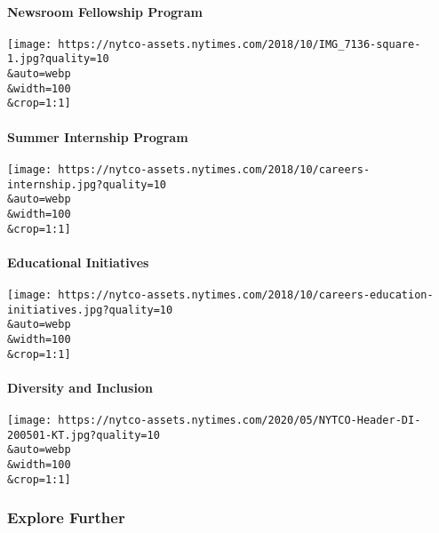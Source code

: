 \href{https://www.nytco.com/careers/newsroom/newsroom-fellowship/}{}

\hypertarget{newsroom-fellowship-program}{%
\paragraph{Newsroom Fellowship
Program}\label{newsroom-fellowship-program}}

\texttt{[image: https://nytco-assets.nytimes.com/2018/10/IMG\_7136-square-1.jpg?quality=10\\\&auto=webp\\\&width=100\\\&crop=1:1]}

\href{https://www.nytco.com/careers/summer-internship-program/}{}

\hypertarget{summer-internship-program}{%
\paragraph{Summer Internship Program}\label{summer-internship-program}}

\texttt{[image: https://nytco-assets.nytimes.com/2018/10/careers-internship.jpg?quality=10\\\&auto=webp\\\&width=100\\\&crop=1:1]}

\href{https://www.nytco.com/social-responsibility/educational-initiatives/}{}

\hypertarget{educational-initiatives}{%
\paragraph{Educational Initiatives}\label{educational-initiatives}}

\texttt{[image: https://nytco-assets.nytimes.com/2018/10/careers-education-initiatives.jpg?quality=10\\\&auto=webp\\\&width=100\\\&crop=1:1]}

\href{https://www.nytco.com/company/diversity-and-inclusion/}{}

\hypertarget{diversity-and-inclusion}{%
\paragraph{Diversity and Inclusion}\label{diversity-and-inclusion}}

\texttt{[image: https://nytco-assets.nytimes.com/2020/05/NYTCO-Header-DI-200501-KT.jpg?quality=10\\\&auto=webp\\\&width=100\\\&crop=1:1]}

\hypertarget{explore-further}{%
\subsubsection{Explore Further}\label{explore-further}}

